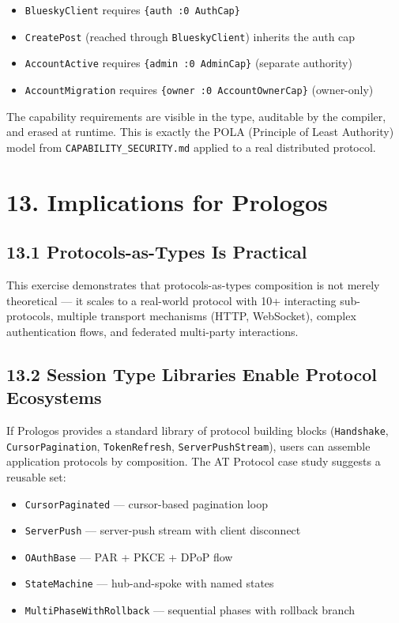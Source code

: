 \documentclass[11pt]{article}
\begin{document}
\begin{itemize}
\item \texttt{BlueskyClient} requires \texttt{\{auth :0 AuthCap\}}
\item \texttt{CreatePost} (reached through \texttt{BlueskyClient}) inherits the auth cap
\item \texttt{AccountActive} requires \texttt{\{admin :0 AdminCap\}} (separate authority)
\item \texttt{AccountMigration} requires \texttt{\{owner :0 AccountOwnerCap\}} (owner-only)
\end{itemize}

The capability requirements are visible in the type, auditable by the
compiler, and erased at runtime. This is exactly the POLA (Principle of
Least Authority) model from \texttt{CAPABILITY\_SECURITY.md} applied to a real
distributed protocol.
\section{13. Implications for Prologos}
\label{sec:orgbafd08e}

\subsection{13.1 Protocols-as-Types Is Practical}
\label{sec:orga7c415a}

This exercise demonstrates that protocols-as-types composition is not merely
theoretical --- it scales to a real-world protocol with 10+ interacting
sub-protocols, multiple transport mechanisms (HTTP, WebSocket), complex
authentication flows, and federated multi-party interactions.
\subsection{13.2 Session Type Libraries Enable Protocol Ecosystems}
\label{sec:org1729b01}

If Prologos provides a standard library of protocol building blocks
(\texttt{Handshake}, \texttt{CursorPagination}, \texttt{TokenRefresh}, \texttt{ServerPushStream}),
users can assemble application protocols by composition. The AT Protocol
case study suggests a reusable set:

\begin{itemize}
\item \texttt{CursorPaginated} — cursor-based pagination loop
\item \texttt{ServerPush} — server-push stream with client disconnect
\item \texttt{OAuthBase} — PAR + PKCE + DPoP flow
\item \texttt{StateMachine} — hub-and-spoke with named states
\item \texttt{MultiPhaseWithRollback} — sequential phases with rollback branch
\end{itemize}
\end{document}
